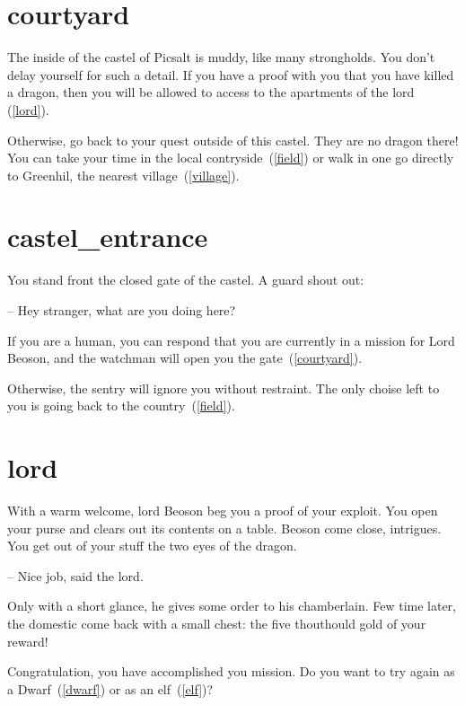 \section{courtyard}

The inside of the castel of Picsalt is muddy, like many strongholds. You don't
delay yourself for such a detail. If you have a proof with you that you have
killed a dragon, then you will be allowed to access to the apartments of the lord
(\ref{lord}).

Otherwise, go back to your quest outside of this castel. They are no dragon
there! You can take your time in the local contryside~(\ref{field}) or walk in
one go directly to Greenhil, the nearest village~(\ref{village}).

\section{castel_entrance}

You stand front the closed gate of the castel. A guard shout out:

-- Hey stranger, what are you doing here?

If you are a human, you can respond that you are currently in a mission for Lord
Beoson, and the watchman will open you the gate~(\ref{courtyard}).

Otherwise, the sentry will ignore you without restraint. The only choise
left to you is going back to the country~(\ref{field}).

\section{lord}

With a warm welcome, lord Beoson beg you a proof of your exploit.  You open
your purse and clears out its contents on a table. Beoson come close,
intrigues. You get out of your stuff the two eyes of the dragon.

-- Nice job, said the lord.

Only with a short glance, he gives some order to his chamberlain. Few time
later, the domestic come back with a small chest: the five thouthould gold of
your reward!

\medbreak

Congratulation, you have accomplished you mission. Do you want to try again as a
Dwarf~(\ref{dwarf}) or as an elf~(\ref{elf})?
